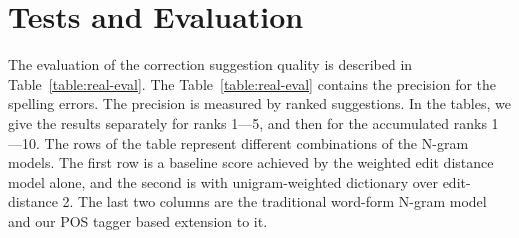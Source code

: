 \documentclass{llncs}
\begin{document}
\section{Tests and Evaluation}
\label{sec:evaluation}

The evaluation of the correction suggestion quality is described in
Table~\ref{table:real-eval}. The Table~\ref{table:real-eval} contains the
precision for the spelling errors. The precision is measured by ranked
suggestions. In the tables, we give the results separately for ranks 1---5, and
then for the accumulated ranks 1---10.  The  rows of the table represent
different combinations of the N-gram models. The first row is a baseline score
achieved by the weighted edit distance model alone, and the second is with
unigram-weighted dictionary over edit-distance 2. The last two columns are the
traditional word-form N-gram model and our POS tagger based extension to it.
\end{document}
